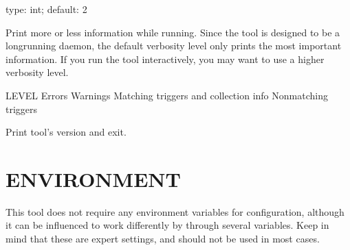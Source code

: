 \documentclass[letterpaper,10pt,english]{sphinxmanual}
\begin{document}
\begin{fulllineitems}
\label{\detokenize{mariadb-stat:cmdoption-mariadb-stat-verbose}}
\sphinxAtStartPar
type: int; default: 2

\sphinxAtStartPar
Print more or less information while running.  Since the tool is designed
to be a long\sphinxhyphen{}running daemon, the default verbosity level only prints the
most important information.  If you run the tool interactively, you may
want to use a higher verbosity level.

\begin{sphinxVerbatim}[commandchars=\\\{\}]
LEVEL 
 
     Errors
     Warnings
     Matching triggers and collection info
     Non\PYGZhy{}matching triggers
\end{sphinxVerbatim}

\end{fulllineitems}


\begin{fulllineitems}
\label{\detokenize{mariadb-stat:cmdoption-mariadb-stat-version}}
\sphinxAtStartPar
Print tool’s version and exit.

\end{fulllineitems}



\section{ENVIRONMENT}
\label{\detokenize{mariadb-stat:environment}}
\sphinxAtStartPar
This tool does not require any environment variables for configuration,
although it can be influenced to work differently by through several
variables.  Keep in mind that these are expert settings, and should not
be used in most cases.
\end{document}
